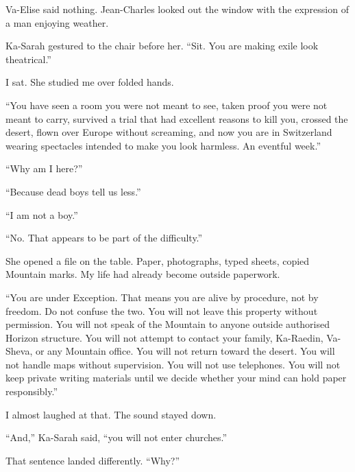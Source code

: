 Va-Elise said nothing. Jean-Charles looked out the window with the expression of a man enjoying weather.\par

Ka-Sarah gestured to the chair before her. ``Sit. You are making exile look theatrical.''\par

I sat. She studied me over folded hands.\par

``You have seen a room you were not meant to see, taken proof you were not meant to carry, survived a trial that had excellent reasons to kill you, crossed the desert, flown over Europe without screaming, and now you are in Switzerland wearing spectacles intended to make you look harmless. An eventful week.''\par

``Why am I here?''\par

``Because dead boys tell us less.''\par

``I am not a boy.''\par

``No. That appears to be part of the difficulty.''\par

She opened a file on the table. Paper, photographs, typed sheets, copied Mountain marks. My life had already become outside paperwork.\par

``You are under Exception. That means you are alive by procedure, not by freedom. Do not confuse the two. You will not leave this property without permission. You will not speak of the Mountain to anyone outside authorised Horizon structure. You will not attempt to contact your family, Ka-Raedin, Va-Sheva, or any Mountain office. You will not return toward the desert. You will not handle maps without supervision. You will not use telephones. You will not keep private writing materials until we decide whether your mind can hold paper responsibly.''\par

I almost laughed at that. The sound stayed down.\par

``And,'' Ka-Sarah said, ``you will not enter churches.''\par

That sentence landed differently. ``Why?''\par

